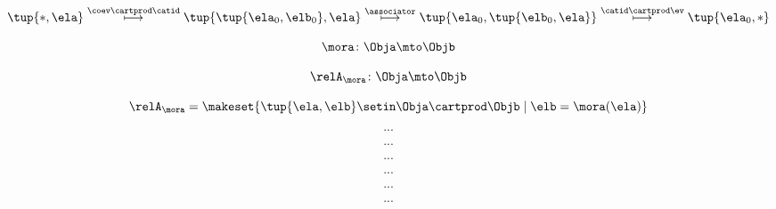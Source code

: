 {\begin{forslides}
        \begin{equation}
            \label{eq:slides_trace_monoidal_36}
            \tup{*, \ela}  \overset{\coev \cartprod \catid}{\longmapsto}  \tup{\tup{\ela_0, \elb_0}, \ela}  \overset{\associator}{\longmapsto}  \tup{\ela_0, \tup{\elb_0, \ela}}   \overset{\catid \cartprod \ev}{\longmapsto}  \tup{\ela_0, *}
        \end{equation}

        \begin{equation}
            \label{eq:slides_trace_monoidal_37}
            \mora \colon \Obja \mto \Objb
        \end{equation}

        \begin{equation}
            \label{eq:slides_trace_monoidal_38}
            \relA_\mora \colon \Obja \mto \Objb
        \end{equation}

        \begin{equation}
            \label{eq:slides_trace_monoidal_39}
            \relA_\mora = \makeset{ \tup{\ela, \elb} \setin \Obja \cartprod \Objb \mid \elb = \mora(\ela)}
        \end{equation}

        \begin{equation}
            \label{eq:slides_trace_monoidal_40}
            ...
        \end{equation}

        \begin{equation}
            \label{eq:slides_trace_monoidal_41}
            ...
        \end{equation}

        \begin{equation}
            \label{eq:slides_trace_monoidal_42}
            ...
        \end{equation}

        \begin{equation}
            \label{eq:slides_trace_monoidal_43}
            ...
        \end{equation}

        \begin{equation}
            \label{eq:slides_trace_monoidal_44}
            ...
        \end{equation}

        \begin{equation}
            \label{eq:slides_trace_monoidal_45}
            ...
        \end{equation}


\end{forslides}}

